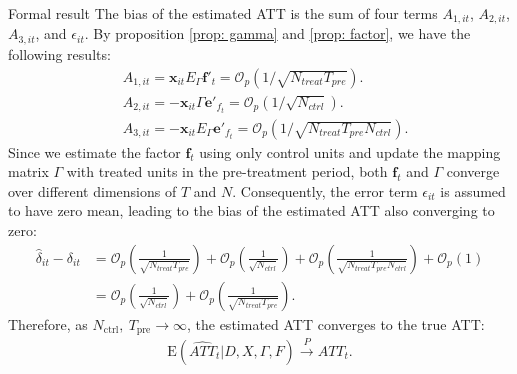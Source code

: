 \documentclass{beamer}
\begin{document}
\begin{frame}{Formal result}
\footnotesize
The bias of the estimated ATT is the sum of four terms $A_{1,it}$, $A_{2,it}$, $A_{3,it}$, and $\epsilon_{it}$. By proposition \ref{prop: gamma} and \ref{prop: factor}, we have the following results:
\begin{equation*}
\begin{aligned}
    &A_{1,it} = \boldsymbol{x}_{it}E_{\Gamma}\boldsymbol{f}'_t = \mathcal{O}_p\left(1/\sqrt{N_{treat}T_{pre}}\right). \\
    &A_{2,it} = -\boldsymbol{x}_{it}\Gamma \boldsymbol{e}'_{f_t} = \mathcal{O}_p\left(1/\sqrt{N_{ctrl}}\right). \\
    &A_{3,it} = -\boldsymbol{x}_{it}E_{\Gamma}\boldsymbol{e}'_{f_t} = \mathcal{O}_p\left(1/\sqrt{N_{treat}T_{pre}N_{ctrl}}\right).
\end{aligned}
\end{equation*}
Since we estimate the factor $\boldsymbol{f}_t$ using only control units and update the mapping matrix $\Gamma$ with treated units in the pre-treatment period, both $\boldsymbol{f}_t$ and $\Gamma$ converge over different dimensions of $T$ and $N$. Consequently, the error term $\epsilon_{it}$ is assumed to have zero mean, leading to the bias of the estimated ATT also converging to zero:
\begin{equation*}
\begin{aligned}
    \hat{\delta}_{it} - \delta_{it} &= \mathcal{O}_p\left(\frac{1}{\sqrt{N_{treat}T_{pre}}}\right) + \mathcal{O}_p\left(\frac{1}{\sqrt{N_{ctrl}}}\right) + \mathcal{O}_p\left(\frac{1}{\sqrt{N_{treat}T_{pre}N_{ctrl}}}\right) + \mathcal{O}_p(1) \\
    &= \mathcal{O}_p\left(\frac{1}{\sqrt{N_{ctrl}}} \right) + \mathcal{O}_p\left(\frac{1}{\sqrt{N_{treat}T_{pre}}} \right).
\end{aligned}
\end{equation*}
Therefore, as $N_{\text{ctrl}}, \ T_{\text{pre}} \to \infty$, the estimated ATT converges to the true ATT:
\begin{equation*}
\begin{aligned}
    \mathrm{E}\left(\widehat{ATT}_{t} | D, X, \Gamma, F\right) \xrightarrow{P} ATT_{t}.
\end{aligned}
\end{equation*}
\end{frame}
\end{document}
